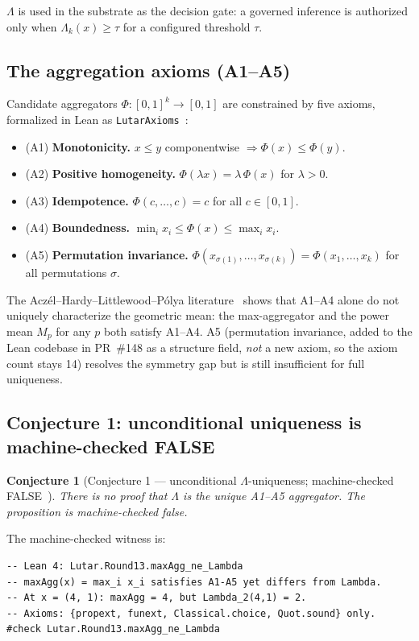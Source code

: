 \documentclass[11pt,letterpaper]{article}
\theoremstyle{definition}
\newtheorem{conjecture}[theorem]{Conjecture}
\newcommand{\Lam}{\Lambda}
\begin{document}
\noindent $\Lam$ is used in the substrate as the decision gate: a governed
inference is authorized only when $\Lam_k(x) \ge \tau$ for a configured
threshold $\tau$.

\subsection{The aggregation axioms (A1--A5)}

Candidate aggregators $\Phi:[0,1]^k\to[0,1]$ are constrained by five axioms,
formalized in Lean as \texttt{LutarAxioms}~\cite{lutarlean}:
\begin{itemize}[noitemsep]
  \item (A1) \textbf{Monotonicity.} $x \le y$ componentwise $\Rightarrow \Phi(x) \le \Phi(y)$.
  \item (A2) \textbf{Positive homogeneity.} $\Phi(\lambda x) = \lambda\,\Phi(x)$
        for $\lambda > 0$.
  \item (A3) \textbf{Idempotence.} $\Phi(c,\ldots,c) = c$ for all $c\in[0,1]$.
  \item (A4) \textbf{Boundedness.} $\min_i x_i \le \Phi(x) \le \max_i x_i$.
  \item (A5) \textbf{Permutation invariance.} $\Phi(x_{\sigma(1)},\ldots,x_{\sigma(k)})
        = \Phi(x_1,\ldots,x_k)$ for all permutations $\sigma$.
\end{itemize}
The Acz\'el--Hardy--Littlewood--P\'olya literature~\cite{aczel1966,hardy1934}
shows that A1--A4 alone do not uniquely characterize the geometric mean: the
max-aggregator and the power mean $M_p$ for any $p$ both satisfy A1--A4.  A5
(permutation invariance, added to the Lean codebase in PR~\#148 as a structure
field, \emph{not} a new axiom, so the axiom count stays 14) resolves the symmetry
gap but is still insufficient for full uniqueness.

\subsection{Conjecture 1: unconditional uniqueness is machine-checked FALSE}

\begin{conjecture}[Conjecture 1 --- unconditional $\Lam$-uniqueness;
  machine-checked FALSE~\cite{szl_v14,szl_concept}]
\label{conj:lambda}
\emph{There is no proof that $\Lam$ is the unique A1--A5 aggregator.
The proposition is machine-checked false.}
\end{conjecture}

\noindent The machine-checked witness is:
\begin{lstlisting}
-- Lean 4: Lutar.Round13.maxAgg_ne_Lambda
-- maxAgg(x) = max_i x_i satisfies A1-A5 yet differs from Lambda.
-- At x = (4, 1): maxAgg = 4, but Lambda_2(4,1) = 2.
-- Axioms: {propext, funext, Classical.choice, Quot.sound} only.
#check Lutar.Round13.maxAgg_ne_Lambda
\end{lstlisting}
\end{document}
